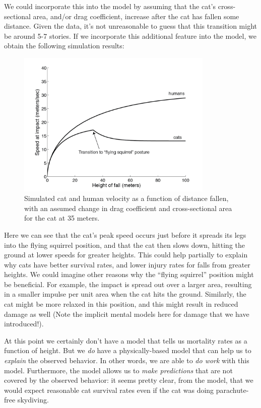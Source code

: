 We could incorporate this into the model by assuming that the cat's
cross-sectional area, and/or drag coefficient, increase after the cat
has fallen some distance.  Given the data, it's not unreasonable to
guess that this transition might be around 5-7 stories.  If we
incorporate this additional feature into the model, we obtain the
following simulation results:

\begin{figure}

\centerline{\includegraphics[height=7cm]{figs/CatSpeedWithPosture}}

\caption{Simulated cat and human velocity as a function of distance fallen, with an assumed change in drag coefficient and cross-sectional area for the cat at 35 meters. }

\end{figure}



Here we can see that the cat's peak speed occurs just before it
spreads its legs into the flying squirrel position, and that the cat
then slows down, hitting the ground at lower speeds for greater
heights.  This could help partially to explain why cats have better
survival rates, and lower injury rates for falls from greater heights.
We could imagine other reasons why the ``flying squirrel'' position
might be beneficial.  For example, the impact is spread out over a
larger area, resulting in a smaller impulse per unit area when the cat
hits the ground.  Similarly, the cat might be more relaxed in this
position, and this might result in reduced damage as well (Note the
implicit mental models here for damage that we have introduced!).

At this point we certainly don't have a model that tells us mortality
rates as a function of height.  But we {\it do} have a
physically-based model that can help us to {\it explain} the observed
behavior.  In other words, we are able to {\it do work} with this
model.  Furthermore, the model allows us to {\it make predictions}
that are not covered by the observed behavior: it seems pretty clear,
from the model, that we would expect reasonable cat survival rates
even if the cat was doing parachute-free skydiving.

